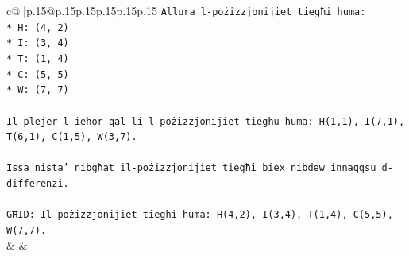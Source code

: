\documentclass{article}
\begin{document}
{\begin{supertabular}{c@{$\;$}|p{.15\linewidth}@{}p{.15\linewidth}p{.15\linewidth}p{.15\linewidth}p{.15\linewidth}p{.15\linewidth}}
{{{\texttt{Allura l{-}pożizzjonijiet tiegħi huma:} \\
\texttt{*   H: (4, 2)} \\
\texttt{*   I: (3, 4)} \\
\texttt{*   T: (1, 4)} \\
\texttt{*   C: (5, 5)} \\
\texttt{*   W: (7, 7)} \\
\\ 
\texttt{Il{-}plejer l{-}ieħor qal li l{-}pożizzjonijiet tiegħu huma: H(1,1), I(7,1), T(6,1), C(1,5), W(3,7).} \\
\\ 
\texttt{Issa nista' nibgħat il{-}pożizzjonijiet tiegħi biex nibdew innaqqsu d{-}differenzi.} \\
\\ 
\texttt{GĦID: Il{-}pożizzjonijiet tiegħi huma: H(4,2), I(3,4), T(1,4), C(5,5), W(7,7).} \\
            }
        }
    }
    & & \\ \\


\end{supertabular}}
\end{document}
